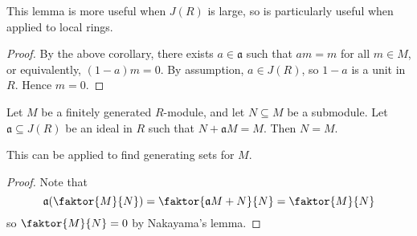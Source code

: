 This lemma is more useful when \( J(R) \) is large, so is particularly useful when applied to local rings.
\begin{proof}
    By the above corollary, there exists \( a \in \mathfrak a \) such that \( am = m \) for all \( m \in M \), or equivalently, \( (1 - a)m = 0 \).
    By assumption, \( a \in J(R) \), so \( 1 - a \) is a unit in \( R \).
    Hence \( m = 0 \).
\end{proof}
\begin{corollary}
    Let \( M \) be a finitely generated \( R \)-module, and let \( N \subseteq M \) be a submodule.
    Let \( \mathfrak a \subseteq J(R) \) be an ideal in \( R \) such that \( N + \mathfrak a M = M \).
    Then \( N = M \).
\end{corollary}
This can be applied to find generating sets for \( M \).
\begin{proof}
    Note that
    \[ \mathfrak a \qty(\faktor{M}{N}) = \faktor{\mathfrak a M + N}{N} = \faktor{M}{N} \]
    so \( \faktor{M}{N} = 0 \) by Nakayama's lemma.
\end{proof}
